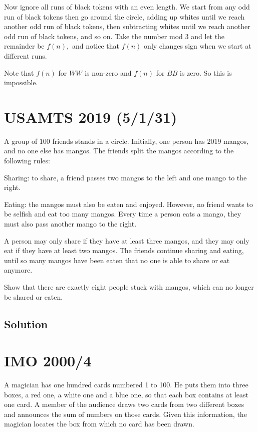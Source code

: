 \documentclass[mast]{lucky}
\begin{document}
Now ignore all runs of black tokens with an even length. We start from any odd run of black tokens then go around the circle, adding up whites until we reach another odd run of black tokens, then subtracting whites until we reach another odd run of black tokens, and so on. Take the number mod $3$ and let the remainder be $f(n),$ and notice that $f(n)$ only changes sign when we start at different runs.

Note that $f(n)$ for $WW$ is non-zero and $f(n)$ for $BB$ is zero. So this is impossible.

\pagebreak\section{USAMTS 2019 (5/1/31)}

A group of $100$ friends stands in a circle. Initially, one person has $2019$ mangos, and
no one else has mangos. The friends split the mangos according to the following rules:

\begin{itemize}
     \Item Sharing: to share, a friend passes two mangos to the left and one mango to the right.

     \Item Eating: the mangos must also be eaten and enjoyed. However, no friend wants to be
selfish and eat too many mangos. Every time a person eats a mango, they must also
pass another mango to the right.
\end{itemize}

A person may only share if they have at least three mangos, and they may only eat if they
have at least two mangos. The friends continue sharing and eating, until so many mangos
have been eaten that no one is able to share or eat anymore.

Show that there are exactly eight people stuck with mangos, which can no longer be shared or eaten.

\subsection{Solution}
 
\pagebreak\section{IMO 2000/4} 

A magician has one hundred cards numbered 1 to 100. He puts them into three boxes, a red one, a white one and a blue one, so that each box contains at least one card. A member of the audience draws two cards from two different boxes and announces the sum of numbers on those cards. Given this information, the magician locates the box from which no card has been drawn.
\end{document}
